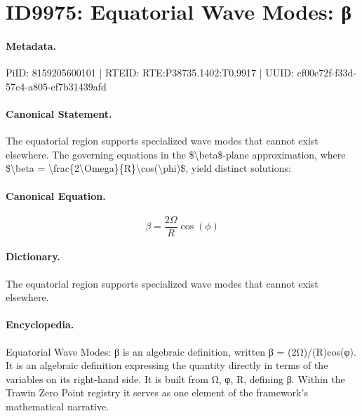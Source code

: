 \section*{ID9975: Equatorial Wave Modes: β}
\paragraph{Metadata.}
PiID: 8159205600101 | RTEID: RTE:P38735.1402:T0.9917 | UUID: cf00e72f-f33d-57c4-a805-ef7b31439afd

\paragraph{Canonical Statement.}
The equatorial region supports specialized wave modes that cannot exist elsewhere. The governing equations in the \$\textbackslash{}beta\$-plane approximation, where \$\textbackslash{}beta = \textbackslash{}frac\{2\textbackslash{}Omega\}\{R\}\textbackslash{}cos(\textbackslash{}phi)\$, yield distinct solutions:

\paragraph{Canonical Equation.}
\[
\beta = \frac{2\Omega}{R}\cos(\phi)
\]

\paragraph{Dictionary.}
The equatorial region supports specialized wave modes that cannot exist elsewhere.

\paragraph{Encyclopedia.}
Equatorial Wave Modes: β is an algebraic definition, written β = (2Ω)/(R)cos(φ). It is an algebraic definition expressing the quantity directly in terms of the variables on its right-hand side. It is built from Ω, φ, R, defining β. Within the Trawin Zero Point registry it serves as one element of the framework's mathematical narrative.
